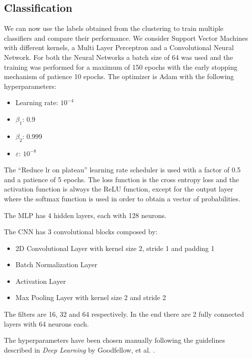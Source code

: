 \subsection{Classification}
We can now use the labels obtained from the clustering to train multiple
classifiers and compare their performance.
We consider Support Vector Machines with different kernels, a Multi Layer
Perceptron and a Convolutional Neural Network.
For both the Neural Networks a batch size of 64 was used and the training
was performed for a maximum of 150 epochs with the early stopping mechanism
of patience 10 epochs.
The optimizer is Adam with the following hyperparameters:
\begin{itemize}
    \item Learning rate: $10^{-4}$
    \item $\beta_1$: 0.9
    \item $\beta_2$: 0.999
    \item $\varepsilon$: $10^{-8}$
\end{itemize}
The \enquote{Reduce lr on plateau} learning rate scheduler is used with a factor
of 0.5 and a patience of 5 epochs.
The loss function is the cross entropy loss and the activation function
is always the ReLU function, except for the output layer where the softmax
function is used in order to obtain a vector of probabilities.

The MLP has 4 hidden layers, each with 128 neurons.

The CNN has 3 convolutional blocks composed by:
\begin{itemize}
    \item 2D Convolutional Layer with kernel size 2, stride 1 and padding 1
    \item Batch Normalization Layer
    \item Activation Layer
    \item Max Pooling Layer with kernel size 2 and stride 2
\end{itemize}
The filters are 16, 32 and 64 respectively. In the end there are 2 fully
connected layers with 64 neurons each.

The hyperparameters have been chosen manually following the guidelines
described in \textit{Deep Learning} by Goodfellow, et al. \cite{goodfellow2016deep}.



